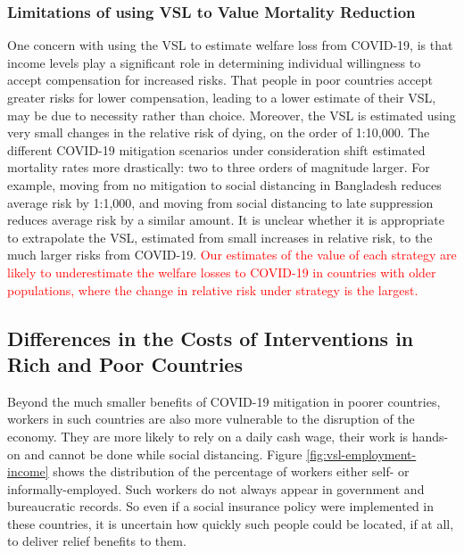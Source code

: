 \documentclass[11pt]{article}
\begin{document}
\subsubsection{Limitations of using VSL to Value Mortality Reduction}

One concern with using the VSL to estimate welfare loss from COVID-19, is that income levels play a significant role in determining individual willingness to accept compensation for increased risks. That people in poor countries accept greater risks for lower compensation, leading to a lower estimate of their VSL, may be due to necessity rather than choice. Moreover, the VSL is estimated using very small changes in the relative risk of dying, on the order of 1:10,000. The different COVID-19 mitigation scenarios under consideration shift estimated mortality rates more drastically: two to three orders of magnitude larger. For example, moving from no mitigation to social distancing in Bangladesh reduces average risk by 1:1,000, and moving from social distancing to late suppression reduces average risk by a similar amount. It is unclear whether it is appropriate to extrapolate the  VSL, estimated from small increases in relative risk, to the much larger risks from COVID-19. \textcolor{red}{Our estimates of the value of each strategy are likely to underestimate the welfare losses to COVID-19 in countries with older populations, where the change in relative risk under strategy is the largest.}

\subsection{Differences in the Costs of Interventions in Rich and Poor Countries}

Beyond the much smaller benefits of COVID-19 mitigation in poorer countries, workers in such countries are also more vulnerable to the disruption of the economy. They are more likely to rely on a daily cash wage, their work is hands-on and cannot be done while social distancing. Figure \ref{fig:vsl-employment-income} shows the distribution of the percentage of workers either self- or informally-employed. Such workers do not always appear in government and bureaucratic records. So even if a social insurance policy were implemented in these countries, it is uncertain how quickly such people could be located, if at all, to deliver relief benefits to them.
\end{document}
